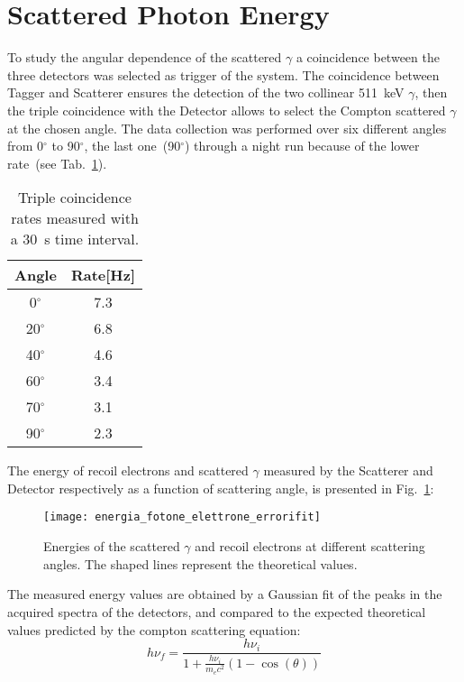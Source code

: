 \newpage
\section*{Scattered Photon Energy}
To study the angular dependence of the scattered $\gamma$ a coincidence between the three detectors was selected as trigger of the system. The coincidence between Tagger and Scatterer ensures the detection of the  two collinear 511~keV $\gamma$, then the triple coincidence with the Detector allows to select the Compton scattered $\gamma$ at the chosen angle. The data collection was performed over six different angles from 0$^\circ$ to 90$^\circ$, the last one~(90$^\circ$) through a night run because of the lower rate~(see Tab.~\ref{Tab:Rates}). 
\begin{table}[H]
	\centering
	\begin{tabular}{cc}
		\toprule
		\toprule
		 Angle & Rate[Hz] \\
		\midrule
		   0$^\circ$ & 7.3 \\
		20$^\circ$ & 6.8\\
	    40$^\circ$ & 4.6\\
	    60$^\circ$ & 3.4\\
	    70$^\circ$ & 3.1\\
	    90$^\circ$ & 2.3\\
		\bottomrule
		\bottomrule
	\end{tabular}
	\caption{Triple coincidence rates measured with a 30~s time interval.}
	\label{Tab:Rates}
\end{table}

The energy of recoil electrons and scattered $\gamma$ measured by the Scatterer and Detector respectively as a function of scattering angle, is presented in Fig.~\ref{Fig:Scattering_angles}:

\begin{figure}[H]
	\centering
	\texttt{[image: energia\_fotone\_elettrone\_errorifit]}
	\caption{Energies of the scattered $\gamma$ and recoil electrons at different scattering angles. The shaped lines represent the theoretical values.}
	\label{Fig:Scattering_angles}
\end{figure}

\newpage
The measured energy values are obtained by a Gaussian fit of the peaks in the acquired spectra of the detectors, and compared to the expected theoretical values predicted by the compton scattering equation:
\begin{equation*}
	h\nu_f=\frac{h\nu_i}{1+\frac{h\nu_i}{m_e c^2}\left(1-\cos(\theta)\right)}
\end{equation*}

